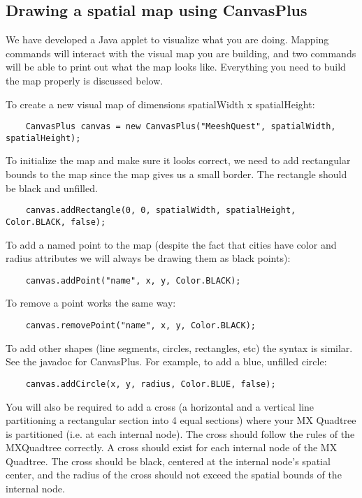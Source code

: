 \documentclass[12pt]{article}
\begin{document}
\subsection{Drawing a spatial map using CanvasPlus}
We have developed a Java applet to visualize what you are doing. Mapping commands 
will interact with the visual map you are building, and two commands will be able to print out what
 the map looks like. Everything you need to build the map properly is discussed below.

To create a new visual map of dimensions spatialWidth x spatialHeight:
\begin{verbatim}
	CanvasPlus canvas = new CanvasPlus("MeeshQuest", spatialWidth, spatialHeight);
\end{verbatim}

To initialize the map and make sure it looks correct, we need to add rectangular bounds to the map since the map gives 
us a small border. The rectangle should be black and unfilled.
\begin{verbatim}
	canvas.addRectangle(0, 0, spatialWidth, spatialHeight, Color.BLACK, false);
\end{verbatim}

To add a named point to the map (despite the fact that cities have color and radius attributes we will always be drawing them as black points):
\begin{verbatim}
	canvas.addPoint("name", x, y, Color.BLACK);
\end{verbatim}

To remove a point works the same way:
\begin{verbatim}
	canvas.removePoint("name", x, y, Color.BLACK);
\end{verbatim}

To add other shapes (line segments, circles, rectangles, etc) the syntax is similar. See the javadoc for CanvasPlus.
For example, to add a blue, unfilled circle:
\begin{verbatim}
	canvas.addCircle(x, y, radius, Color.BLUE, false);
\end{verbatim}

You will also be required to add a cross (a horizontal and a vertical line partitioning a rectangular section into 4 equal sections) where your MX Quadtree is partitioned (i.e. at each internal node). The cross should follow the rules of the MXQuadtree correctly. A cross should exist for each internal node of the MX Quadtree. The cross should be black, centered at the internal node's spatial center, and the radius of the cross should not exceed the spatial bounds of the internal node.
\end{document}
